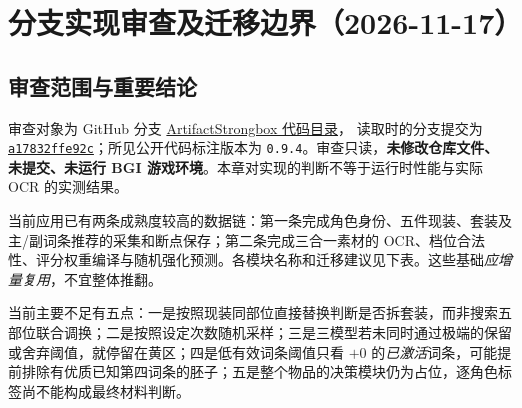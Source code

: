 \documentclass[11pt,a4paper]{ctexart}
\begin{document}
\clearpage
\section{分支实现审查及迁移边界（2026-11-17）}
\subsection{审查范围与重要结论}
审查对象为 GitHub 分支
\href{https://github.com/Zhuozhuo-219/bettergi-scripts-list/tree/custom/fishing-area-priority/repo/js/ArtifactStrongbox}{ArtifactStrongbox 代码目录}，
读取时的分支提交为 \href{https://github.com/Zhuozhuo-219/bettergi-scripts-list/commit/a17832ffe92cfbc83b70ea74287f7de7f19cfc3a}{\texttt{a17832ffe92c}}；所见公开代码标注版本为 \texttt{0.9.4}。审查只读，\textbf{未修改仓库文件、未提交、未运行 BGI 游戏环境}。本章对实现的判断不等于运行时性能与实际 OCR 的实测结果。

当前应用已有两条成熟度较高的数据链：第一条完成角色身份、五件现装、套装及主/副词条推荐的采集和断点保存；第二条完成三合一素材的 OCR、档位合法性、评分权重编译与随机强化预测。各模块名称和迁移建议见下表。这些基础\emph{应增量复用}，不宜整体推翻。

当前主要不足有五点：一是按照现装同部位直接替换判断是否拆套装，而非搜索五部位联合调换；二是按照设定次数随机采样；三是三模型若未同时通过极端的保留或舍弃阈值，就停留在黄区；四是低有效词条阈值只看 $+0$ 的\emph{已激活}词条，可能提前排除有优质已知第四词条的胚子；五是整个物品的决策模块仍为占位，逐角色标签尚不能构成最终材料判断。
\end{document}
